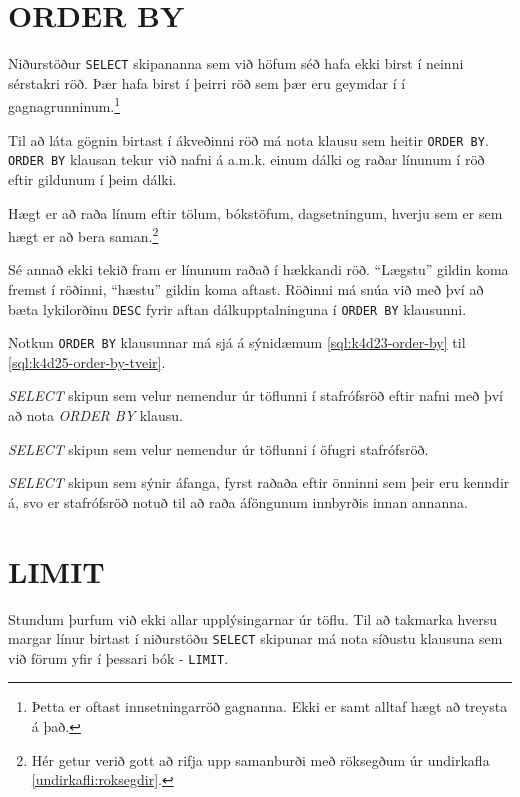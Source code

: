 \section{ORDER BY}
Niðurstöður \verb|SELECT| skipananna sem við höfum séð hafa ekki birst í neinni sérstakri röð. Þær hafa birst í þeirri röð sem þær eru geymdar í í gagnagrunninum.\footnote{Þetta er oftast innsetningarröð gagnanna. Ekki er samt alltaf hægt að treysta á það.}

Til að láta gögnin birtast í ákveðinni röð má nota klausu sem heitir \verb|ORDER BY|. \verb|ORDER BY| klausan tekur við nafni á a.m.k. einum dálki og raðar línunum í röð eftir gildunum í þeim dálki.

Hægt er að raða línum eftir tölum, bókstöfum, dagsetningum, hverju sem er sem hægt er að bera saman.\footnote{Hér getur verið gott að rifja upp samanburði með röksegðum úr undirkafla \ref{undirkafli:roksegdir}.}

Sé annað ekki tekið fram er línunum raðað í hækkandi röð. ``Lægstu'' gildin koma fremst í röðinni, ``hæstu'' gildin koma aftast. Röðinni má snúa við með því að bæta lykilorðinu \verb|DESC| fyrir aftan dálkupptalninguna í \verb|ORDER BY| klausunni.

Notkun \verb|ORDER BY| klausunnar má sjá á sýnidæmum \ref{sql:k4d23-order-by} til \ref{sql:k4d25-order-by-tveir}.

\begin{example}
\caption[ORDER BY]{\emph{SELECT} skipun sem velur nemendur úr töflunni í stafrófsröð eftir nafni með því að nota \emph{ORDER BY} klausu.}
\label{sql:k4d23-order-by}
\centering
{}
\end{example}

\begin{example}
\caption[ORDER BY með DESC]{\emph{SELECT} skipun sem velur nemendur úr töflunni í öfugri stafrófsröð.}
\label{sql:k4d24-order-by-desc}
\centering
{}
\end{example}

\begin{example}
\caption[ORDER BY með tveimur dálkum]{\emph{SELECT} skipun sem sýnir áfanga, fyrst raðaða eftir önninni sem þeir eru kenndir á, svo er stafrófsröð notuð til að raða áföngunum innbyrðis innan annanna.}
\label{sql:k4d25-order-by-tveir}
\centering
{}
\end{example}
\section{LIMIT}
Stundum þurfum við ekki allar upplýsingarnar úr töflu. Til að takmarka hversu margar línur birtast í niðurstöðu \verb|SELECT| skipunar má nota síðustu klausuna sem við förum yfir í þessari bók - \verb|LIMIT|.

